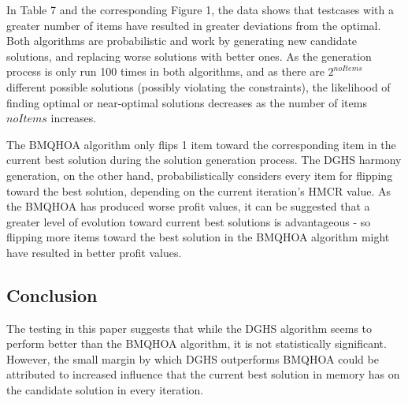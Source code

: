\documentclass[titlepage]{article}
\begin{document}
In Table 7 and the corresponding Figure 1, the data shows that testcases with a greater number of items have resulted in greater deviations from the optimal. Both algorithms are probabilistic and work by generating new candidate solutions, and replacing worse solutions with better ones. As the generation process is only run 100 times in both algorithms, and as there are $2^{noItems}$ different possible solutions (possibly violating the constraints), the likelihood of finding optimal or near-optimal solutions decreases as the number of items $noItems$ increases.

The BMQHOA algorithm only flips 1 item toward the corresponding item in the current best solution during the solution generation process. The DGHS harmony generation, on the other hand, probabilistically considers every item for flipping toward the best solution, depending on the current iteration's HMCR value.  As the BMQHOA has produced worse profit values, it can be suggested that a greater level of evolution toward current best solutions is advantageous - so flipping more items toward the best solution in the BMQHOA algorithm might have resulted in better profit values. 


\subsection{Conclusion}
The testing in this paper suggests that while the DGHS algorithm seems to perform better than the BMQHOA algorithm, it is not statistically significant. However, the small margin by which DGHS outperforms BMQHOA could be attributed to increased influence that the current best solution in memory has on the candidate solution in every iteration. 

\newpage



\end{document}
